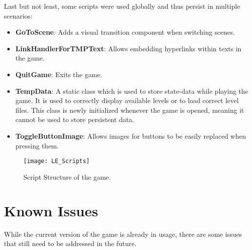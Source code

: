 \documentclass[draft,final]{vutinfth} %
\begin{document}
Last but not least, some scripts were used globally and thus persist in multiple scenarios:
\begin{itemize}
\item \textbf{GoToScene}: Adds a visual transition component when switching scenes.
\item \textbf{LinkHandlerForTMPText}: Allows embedding hyperlinks within texts in the game.
\item \textbf{QuitGame}: Exits the game.
\item \textbf{TempData}: A static class which is used to store state-data while playing the game. It is used to correctly display available levels or to load correct level files. This class is newly initialized whenever the game is opened, meaning it cannot be used to store persistent data.
\item \textbf{ToggleButtonImage}: Allows images for buttons to be easily replaced when pressing them.
\end{itemize}

\begin{figure}
  \centering
  \texttt{[image: LE\_Scripts]}
  \caption{Script Structure of the game.}
\end{figure}
\section{Known Issues}
While the current version of the game is already in usage, there are some issues that still need to be addressed in the future. 
\end{document}
